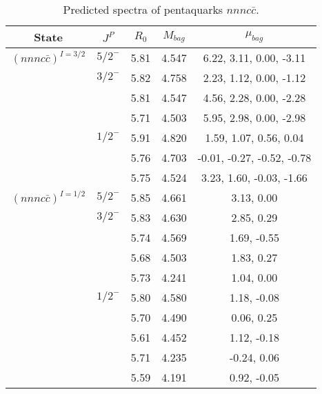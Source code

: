 \documentclass[prd,twocolumn,floatfix,nofootinbib]{revtex4}
\begin{document}
\renewcommand{\tabcolsep}{0.5cm}
\renewcommand{\arraystretch}{1.2}
\begin{table*}[!htbp]
    \caption{Predicted spectra of pentaquarks $nnnc\bar{c}$.}
    \begin{tabular}{ccccc}
        \hline\hline
        {\rm State} &$J^{P}$ &$R_{0}$ &$M_{bag}$ &$\mu_{bag}$ \\ \hline
        ${(nnnc\bar{c})}^{I=3/2}$
            &${5/2}^{-}$    &5.81   &4.547 &6.22, 3.11, 0.00, -3.11 \\
            &${3/2}^{-}$    &5.82   &4.758 &2.23, 1.12, 0.00, -1.12  \\
            &               &5.81   &4.547 &4.56, 2.28, 0.00, -2.28  \\
            &               &5.71   &4.503 &5.95, 2.98, 0.00, -2.98  \\
            &${1/2}^{-}$    &5.91   &4.820 &1.59, 1.07, 0.56, 0.04  \\
            &               &5.76   &4.703 &-0.01, -0.27, -0.52, -0.78  \\
            &               &5.75   &4.524 &3.23, 1.60, -0.03, -1.66  \\
        ${(nnnc\bar{c})}^{I=1/2}$
            &${5/2}^{-}$    &5.85   &4.661 &3.13, 0.00 \\
            &${3/2}^{-}$    &5.83   &4.630 &2.85, 0.29 \\
            &               &5.74   &4.569 &1.69, -0.55 \\
            &               &5.68   &4.503 &1.83, 0.27  \\
            &               &5.73   &4.241 &1.04, 0.00  \\
            &${1/2}^{-}$    &5.80   &4.580 &1.18, -0.08  \\
            &               &5.70   &4.490 &0.06, 0.25  \\
            &               &5.61   &4.452 &1.12, -0.18  \\
            &               &5.71   &4.235 &-0.24, 0.06  \\
            &               &5.59   &4.191 &0.92, -0.05  \\
        \hline\hline
    \end{tabular}
\end{table*}
\end{document}
